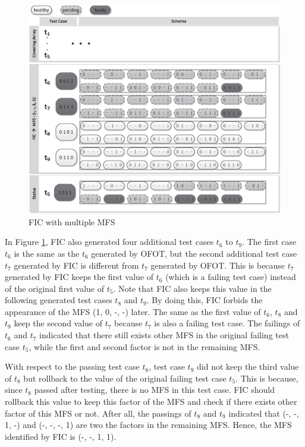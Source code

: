 \begin{figure}[!htb]
 \centering
 \includegraphics[width=5.3in]{fic.eps}
 \caption{FIC with multiple MFS}
 \label{fig_fic_multi}
\end{figure}

In Figure \ref{fig_fic_multi}, FIC also generated four additional test cases $t_{6}$ to $t_{9}$. The first case $t_{6}$ is the same as the $t_{6}$ generated by OFOT, but the second additional test case $t_{7}$ generated by FIC is different from $t_{7}$ generated by OFOT. This is because $t_{7}$ generated by FIC keeps the first value of $t_{6}$ (which is a failing test case) instead of the original first value of $t_{5}$. Note that FIC also keeps this value in the following generated test cases $t_{8}$ and $t_{9}$. By doing this, FIC forbids the appearance of the MFS (1, 0, -, -) later. The same as the first value of $t_{6}$, $t_{8}$ and $t_{9}$ keep the second value of $t_{7}$ because $t_{7}$ is also a failing test case. The failings of $t_{6}$ and $t_{7}$ indicated that there still exists other MFS in the original failing test case $t_{5}$, while the first and second factor is not in the remaining MFS.

With respect to the passing test case $t_{8}$, test case $t_{9}$ did not keep the third value of $t_{8}$ but rollback to the value of the original failing test case $t_{5}$. This is because, since $t_{8}$ passed after testing, there is no MFS in this test case. FIC should rollback this value to keep this factor of the MFS and check if there exists other factor of this MFS or not. After all, the passings of $t_{8}$ and $t_{9}$ indicated that (-, -, 1, -) and (-, -, -, 1) are two the factors in the remaining MFS. Hence, the MFS identified by FIC is (-, -, 1, 1).

